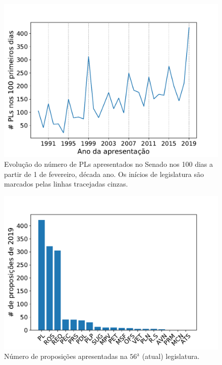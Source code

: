 \documentclass[12pt,a4paper]{article}
\begin{document}
\begin{figure}[H]
\centering
\includegraphics[width=1.0\textwidth]{graficos/senado/PLs-por-ano.pdf}
\caption{Evolução do número de PLs apresentados no Senado nos 100 dias a partir de 1 de fevereiro, década ano. Os inícios de legislatura são marcados pelas linhas tracejadas cinzas.}
\label{fig:pl-total-senado}
\end{figure}


\begin{figure}[H]
\centering
\includegraphics[width=1.0\textwidth]{graficos/senado/proposicoes-2019-por-tipo.pdf}
\caption{Número de proposições apresentadas na $56^{\mathrm{\underline{a}}}$ (atual) legislatura.}
\label{fig:pl-por-tipo-senado}
\end{figure}
\end{document}
